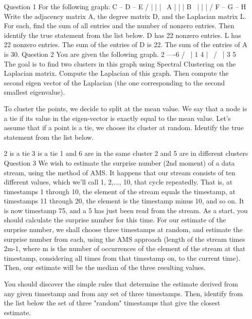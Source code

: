 
Question 1
For the following graph:
   C -- D -- E
 / |    |    | \
A  |    |    |  B
 \ |    |    | /
   F -- G -- H
Write the adjacency matrix A, the degree matrix D, and the Laplacian matrix L. For each, find the sum of all entries and the number of nonzero entries. Then identify the true statement from the list below.
D has 22 nonzero entries.
L has 22 nonzero entries.
The sum of the entries of D is 22.
The sum of the entries of A is 30.
Question 2
You are given the following graph.
   2 ----6
 /  \    |
1    4   |
 \  /  \ |
  3      5 
The goal is to find two clusters in this graph using Spectral Clustering on the Laplacian matrix. Compute the Laplacian of this graph. Then compute the second eigen vector of the Laplacian (the one corresponding to the second smallest eigenvalue).

To cluster the points, we decide to split at the mean value. We say that a node is a tie if its value in the eigen-vector is exactly equal to the mean value. Let's assume that if a point is a tie, we choose its cluster at random. Identify the true statement from the list below.

2 is a tie
3 is a tie
1 and 6 are in the same cluster
2 and 5 are in different clusters
Question 3
We wish to estimate the surprise number (2nd moment) of a data stream, using the method of AMS. It happens that our stream consists of ten different values, which we'll call 1, 2,..., 10, that cycle repeatedly. That is, at timestamps 1 through 10, the element of the stream equals the timestamp, at timestamps 11 through 20, the element is the timestamp minus 10, and so on. It is now timestamp 75, and a 5 has just been read from the stream. As a start, you should calculate the surprise number for this time.
For our estimate of the surprise number, we shall choose three timestamps at random, and estimate the surprise number from each, using the AMS approach (length of the stream times 2m-1, where m is the number of occurrences of the element of the stream at that timestamp, considering all times from that timestamp on, to the current time). Then, our estimate will be the median of the three resulting values.

You should discover the simple rules that determine the estimate derived from any given timestamp and from any set of three timestamps. Then, identify from the list below the set of three "random" timestamps that give the closest estimate.


